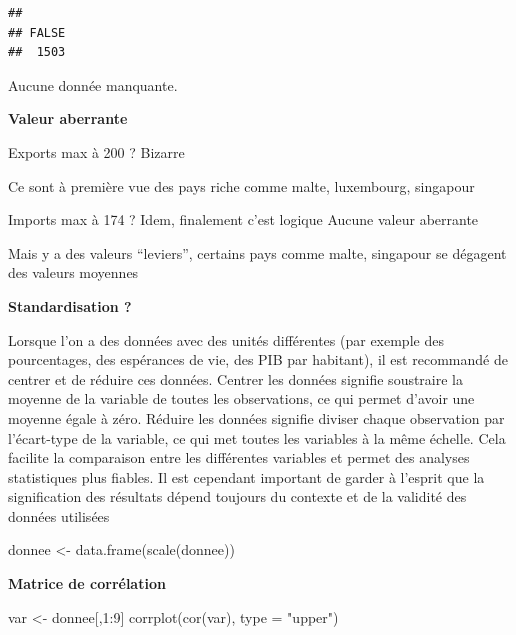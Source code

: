 \documentclass[
]{article}
\newenvironment{Shaded}{}{}
\newcommand{\AttributeTok}[1]{#1}
\newcommand{\DecValTok}[1]{#1}
\newcommand{\FunctionTok}[1]{#1}
\newcommand{\NormalTok}[1]{#1}
\newcommand{\OtherTok}[1]{\textcolor[rgb]{1.00,0.25,0.00}{#1}}
\newcommand{\SpecialCharTok}[1]{\textcolor[rgb]{0.00,0.50,0.50}{#1}}
\newcommand{\StringTok}[1]{\textcolor[rgb]{0.00,0.50,0.50}{#1}}
\begin{document}
\begin{verbatim}
## 
## FALSE 
##  1503
\end{verbatim}

Aucune donnée manquante.

\textbf{Valeur aberrante}

Exports max à 200 ? Bizarre

Ce sont à première vue des pays riche comme malte, luxembourg, singapour

Imports max à 174 ? Idem, finalement c'est logique Aucune valeur
aberrante

Mais y a des valeurs ``leviers'', certains pays comme malte, singapour
se dégagent des valeurs moyennes

\textbf{Standardisation ?}

Lorsque l'on a des données avec des unités différentes (par exemple des
pourcentages, des espérances de vie, des PIB par habitant), il est
recommandé de centrer et de réduire ces données. Centrer les données
signifie soustraire la moyenne de la variable de toutes les
observations, ce qui permet d'avoir une moyenne égale à zéro. Réduire
les données signifie diviser chaque observation par l'écart-type de la
variable, ce qui met toutes les variables à la même échelle. Cela
facilite la comparaison entre les différentes variables et permet des
analyses statistiques plus fiables. Il est cependant important de garder
à l'esprit que la signification des résultats dépend toujours du
contexte et de la validité des données utilisées

\begin{Shaded}
\begin{Highlighting}[]
\NormalTok{donnee }\OtherTok{\textless{}{-}} \FunctionTok{data.frame}\NormalTok{(}\FunctionTok{scale}\NormalTok{(donnee))}
\end{Highlighting}
\end{Shaded}

\textbf{Matrice de corrélation}

\begin{Shaded}
\begin{Highlighting}[]
\NormalTok{var }\OtherTok{\textless{}{-}}\NormalTok{ donnee[,}\DecValTok{1}\SpecialCharTok{:}\DecValTok{9}\NormalTok{]}
\FunctionTok{corrplot}\NormalTok{(}\FunctionTok{cor}\NormalTok{(var), }\AttributeTok{type =} \StringTok{"upper"}\NormalTok{)}
\end{Highlighting}
\end{Shaded}
\end{document}
